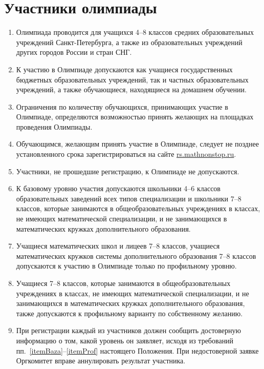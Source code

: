 \documentclass[a4paper,12pt]{article}
\newcommand{\surl}[1]{{\small\url{#1}}}
\begin{document}
\section{Участники олимпиады}

\begin{enumerate}
	\item Олимпиада проводится для учащихся 4–8 классов средних образовательных учреждений Санкт-Петербурга, а также из образовательных учреждений других городов России и стран СНГ.
	\item К участию в Олимпиаде допускаются как учащиеся государственных бюджетных образовательных учреждений, так и частных образовательных учреждений, а также обучающиеся, находящиеся на домашнем обучении.
	\item Ограничения по количеству обучающихся, принимающих участие в Олимпиаде, определяются возможностью принять желающих на площадках проведения Олимпиады.
	\item Обучающимся, желающим принять участие в Олимпиаде, следует не позднее установленного срока зарегистрироваться на сайте \surl{rs.mathnonstop.ru}.
	\item Участники, не прошедшие регистрацию, к Олимпиаде не допускаются.
	\item \label{itemBaza}
	   К базовому уровню участия допускаются школьники 4–6 классов
	   образовательных заведений всех типов специализации и
	   школьники 7–8 классов, которые занимаются в общеобразовательных
	   учреждениях в классах, не имеющих математической специализации,
	   и не занимающихся в математических кружках дополнительного образования.
	\item Учащиеся математических школ и лицеев 7–8 классов,
	   учащиеся математических кружков системы дополнительного образования
	   7–8 классов допускаются к участию в Олимпиаде
	   только по профильному уровню.
	\item \label{itemProf}
	   Учащиеся 7–8 классов, которые занимаются в общеобразовательных
	   учреждениях в классах, не имеющих математической специализации,
	   и не занимающихся в математических кружках дополнительного образования,
	   также допускаются к профильному варианту по собственному желанию.
	\item При регистрации каждый из участников должен сообщить
	   достоверную информацию о том, какой уровень он заявляет, исходя из
	   требований пп.~\ref{itemBaza}–\ref{itemProf} настоящего Положения.
	   При недостоверной заявке Оргкомитет вправе аннулировать
	   результат участника.
\end{enumerate}
\end{document}
